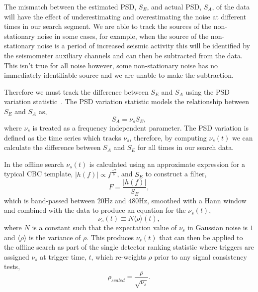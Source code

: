 The mismatch between the estimated PSD, $S_{E}$, and actual PSD, $S_{A}$, of the data will have the effect of underestimating and overestimating the noise at different times in our search segment. We are able to track the sources of the non-stationary noise in some cases, for example, when the source of the non-stationary noise is a period of increased seismic activity this will be identified by the seismometer auxiliary channels and can then be subtracted from the \gwadj data. This isn't true for all noise however, some non-stationary noise has no immediately identifiable source and we are unable to make the subtraction.

Therefore we must track the difference between $S_{E}$ and $S_{A}$ using the PSD variation statistic~\cite{PSD_var:2020}. The PSD variation statistic models the relationship between $S_{E}$ and $S_{A}$ as,
%
\begin{equation}
    S_{A} = \nu_{s} S_{E}, 
\end{equation}
%
where $\nu_{s}$ is treated as a frequency independent parameter. The PSD variation is defined as the time series which tracks $\nu_{s}$, therefore, by computing $\nu_{s}(t)$ we can calculate the difference between $S_{A}$ and $S_{E}$ for all times in our search data.

In the offline search $\nu_{s}(t)$ is calculated using an approximate expression for a typical CBC template, $|h(f)| \propto f^{\frac{-7}{6}}$, and $S_{E}$ to construct a filter,
%
\begin{equation}
    F = \frac{|h(f)|}{S_{E}} ,
    \label{5:eqn:psd-var-filter}
\end{equation}
%
which is band-passed between $20$Hz and $480$Hz, smoothed with a Hann window and combined with the data to produce an equation for the $\nu_{s}(t)$,
%
\begin{equation}
    \nu_{s}(t) \equiv N \langle \rho \rangle(t), 
\end{equation}
%
where $N$ is a constant such that the expectation value of $\nu_{s}$ in Gaussian noise is $1$ and $\langle\rho\rangle$ is the variance of $\rho$. This produces $\nu_{s}(t)$ that can then be applied to the offline search as part of the single detector ranking statistic where triggers are assigned $\nu_{s}$ at trigger time, $t$, which re-weights $\rho$ prior to any signal consistency tests,
%
\begin{equation}
    \rho_{scaled} = \frac{\rho}{\sqrt{\nu_{s}}} .
    \label{5:eqn:psd-var-snr-reweighting}
\end{equation}

